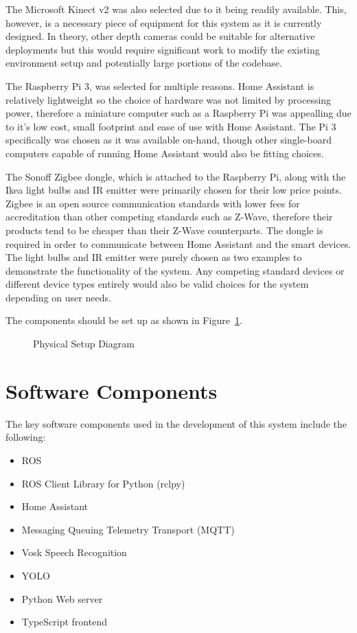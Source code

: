 The Microsoft Kinect v2 was also selected due to it being readily available.
This, however, is a necessary piece of equipment for this system as it is currently designed.
In theory, other depth cameras could be suitable for alternative deployments but this would require significant work to modify the existing environment setup and potentially large portions of the codebase.

The Raspberry Pi 3, was selected for multiple reasons.
Home Assistant is relatively lightweight so the choice of hardware was not limited by processing power, therefore a miniature computer such as a Raspberry Pi was appealling due to it's low cost, small footprint and ease of use with Home Assistant.
The Pi 3 specifically was chosen as it was available on-hand, though other single-board computers capable of running Home Assistant would also be fitting choices.

The Sonoff Zigbee dongle, which is attached to the Raspberry Pi, along with the Ikea light bulbs and IR emitter were primarily chosen for their low price points.
Zigbee is an open source communication standards with lower fees for accreditation than other competing standards such as Z-Wave, therefore their products tend to be cheaper than their Z-Wave counterparts.
The dongle is required in order to communicate between Home Assistant and the smart devices.
The light bulbs and IR emitter were purely chosen as two examples to demonstrate the functionality of the system.
Any competing standard devices or different device types entirely would also be valid choices for the system depending on user needs.

The components should be set up as shown in Figure~\ref{fig:physical_setup_diagram}.

\begin{figure}[H]
    \caption{Physical Setup Diagram}
    \label{fig:physical_setup_diagram}
\end{figure}

\section{Software Components}
The key software components used in the development of this system include the following:
\begin{itemize}
    \item ROS
    \item ROS Client Library for Python (rclpy)
    \item Home Assistant
    \item Messaging Queuing Telemetry Transport (MQTT)
    \item Vosk Speech Recognition
    \item YOLO
    \item Python Web server
    \item TypeScript frontend
\end{itemize}

